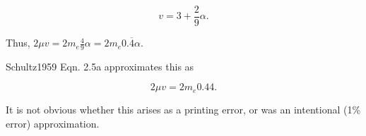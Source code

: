 \documentclass[twocolumn,11pt]{article}
\begin{document}
\begin{equation}
    v=3+\frac{2}{9}\alpha .
\end{equation}

Thus, $2\mu v = 2m_e \frac{4}{9}\alpha = 2m_e 0.\overline{4} \alpha$.

Schultz1959 Eqn. 2.5a approximates this as 

\begin{equation}
    2\mu v = 2m_e 0.44 . 
\end{equation}

It is not obvious whether this arises as a printing error, or was an
intentional (1\% error) approximation.


\end{document}
